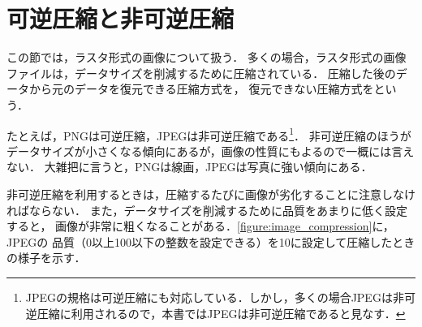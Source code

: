 \documentclass[../../index]{subfiles}
\begin{document}
\section{可逆圧縮と非可逆圧縮}
この節では，ラスタ形式の画像について扱う．
多くの場合，ラスタ形式の画像ファイルは，データサイズを削減するために圧縮されている．
圧縮した後のデータから元のデータを復元できる圧縮方式を，
復元できない圧縮方式をという．

たとえば，PNGは可逆圧縮，JPEGは非可逆圧縮である\footnote{JPEGの規格は可逆圧縮にも対応している．しかし，多くの場合JPEGは非可逆圧縮に利用されるので，本書ではJPEGは非可逆圧縮であると見なす．}．
非可逆圧縮のほうがデータサイズが小さくなる傾向にあるが，画像の性質にもよるので一概には言えない．
大雑把に言うと，PNGは線画，JPEGは写真に強い傾向にある．

非可逆圧縮を利用するときは，圧縮するたびに画像が劣化することに注意しなければならない．
また，データサイズを削減するために品質をあまりに低く設定すると，
画像が非常に粗くなることがある．\cref{figure:image_compression}に，JPEGの
品質（0以上100以下の整数を設定できる）を10に設定して圧縮したときの様子を示す．
\end{document}
